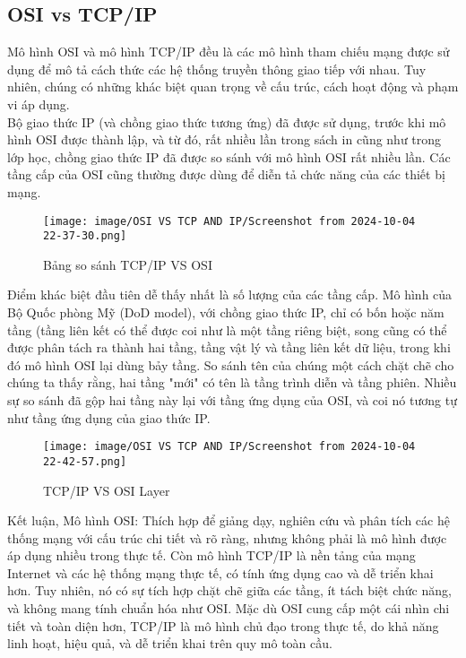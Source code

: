 \documentclass[a4paper,12pt]{article}
\begin{document}
\subsection{OSI vs TCP/IP}
Mô hình OSI và mô hình TCP/IP đều là các mô hình tham chiếu mạng được sử dụng để mô tả cách thức các hệ thống truyền thông giao tiếp với nhau. Tuy nhiên, chúng có những khác biệt quan trọng về cấu trúc, cách hoạt động và phạm vi áp dụng.\\

Bộ giao thức IP (và chồng giao thức tương ứng) đã được sử dụng, trước khi mô hình OSI được thành lập, và từ đó, rất nhiều lần trong sách in cũng như trong lớp học, chồng giao thức IP đã được so sánh với mô hình OSI rất nhiều lần. Các tầng cấp của OSI cũng thường được dùng để diễn tả chức năng của các thiết bị mạng.


\begin{figure}[htbp]
    \centering
    \texttt{[image: image/OSI VS TCP AND IP/Screenshot from 2024-10-04 22-37-30.png]}
    \caption{Bảng so sánh TCP/IP VS OSI}
    \label{}
\end{figure}



Điểm khác biệt đầu tiên dễ thấy nhất là số lượng của các tầng cấp. Mô hình của Bộ Quốc phòng Mỹ (DoD model), với chồng giao thức IP, chỉ có bốn hoặc năm tầng (tầng liên kết có thể được coi như là một tầng riêng biệt, song cũng có thể được phân tách ra thành hai tầng, tầng vật lý và tầng liên kết dữ liệu, trong khi đó mô hình OSI lại dùng bảy tầng. So sánh tên của chúng một cách chặt chẽ cho chúng ta thấy rằng, hai tầng "mới" có tên là tầng trình diễn và tầng phiên. Nhiều sự so sánh đã gộp hai tầng này lại với tầng ứng dụng của OSI, và coi nó tương tự như tầng ứng dụng của giao thức IP.


\begin{figure}[htbp]
    \centering
    \texttt{[image: image/OSI VS TCP AND IP/Screenshot from 2024-10-04 22-42-57.png]}
    \caption{TCP/IP VS OSI Layer}
    \label{}
\end{figure}

Kết luận, Mô hình OSI: Thích hợp để giảng dạy, nghiên cứu và phân tích các hệ thống mạng với cấu trúc chi tiết và rõ ràng, nhưng không phải là mô hình được áp dụng nhiều trong thực tế. Còn mô hình TCP/IP là nền tảng của mạng Internet và các hệ thống mạng thực tế, có tính ứng dụng cao và dễ triển khai hơn. Tuy nhiên, nó có sự tích hợp chặt chẽ giữa các tầng, ít tách biệt chức năng, và không mang tính chuẩn hóa như OSI. Mặc dù OSI cung cấp một cái nhìn chi tiết và toàn diện hơn, TCP/IP là mô hình chủ đạo trong thực tế, do khả năng linh hoạt, hiệu quả, và dễ triển khai trên quy mô toàn cầu.
\end{document}
